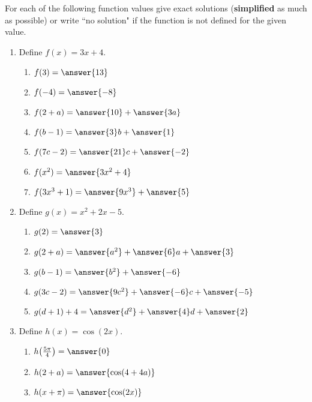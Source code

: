 \documentclass{ximera}
\author{Elizabeth Campolongo}
\begin{document}
\begin{exercise}
For each of the following function values give exact solutions ({\bf simplified} as much as possible) or write ``no solution" if the function is not defined for the given value.
%
\begin{enumerate}
%
\item Define $f(x)= 3x+4.$
\begin{enumerate}
\item $f(3) = \answer{13}$

\item $f(-4) = \answer{-8}$

\item $f(2+a)=\answer{10}+\answer{3a}$

\item $f(b-1) = \answer{3}b+\answer{1}$

\item $f(7c-2) = \answer{21}c+\answer{-2}$

\item $f(x^2) = \answer{3x^2+4}$

\item $f(3x^3+1) = \answer{9x^3} +\answer{5}$
\end{enumerate}

\item Define $g(x)= x^2+2x-5.$
\begin{enumerate}
\item $g(2) = \answer{3}$

\item $g(2+a)=\answer{a^2}+\answer{6}a+\answer{3}$

\item $g(b-1) = \answer{b^2}+ \answer{-6}$

\item $g(3c-2) = \answer{9c^2} +\answer{-6}c + \answer{-5}$

\item $g(d+1)+4 = \answer{d^2}+\answer{4}d+\answer{2}$
\end{enumerate}


\item Define $h(x)= \cos(2x).$
\begin{enumerate}
\item $h\!\left(\frac{5\pi}{4}\right) = \answer{0}$

\item $h(2+a)=\answer{\cos(4+4a)}$

\item $h(x+\pi) = \answer{\cos(2x)}$


\end{enumerate}
\end{enumerate}
\end{exercise}
\end{document}
